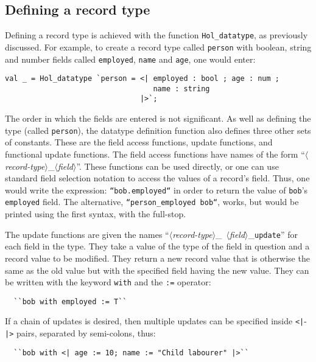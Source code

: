 \subsection{Defining a record type}

Defining a record type is achieved with the function
\texttt{Hol\_datatype}, as previously discussed.  For example, to
create a record type called {\tt person} with boolean, string and
number fields called {\tt employed}, {\tt name} and {\tt age}, one
would enter:
\begin{verbatim}
val _ = Hol_datatype `person = <| employed : bool ; age : num ;
                                  name : string
                               |>`;
\end{verbatim}
The order in which the fields are entered is not significant. As well
as defining the type (called {\tt person}), the datatype definition
function also defines three other sets of constants.  These are the
field access functions, update functions, and functional update
functions.  The field access functions have names of the form
``$\langle$\textsl{record-type\/}$\rangle$\_$\langle$\textsl{field\/}$\rangle$''.
These functions can be used directly, or one can use standard field
selection notation to access the values of a record's field.  Thus,
one would write the expression: \mbox{\tt ``bob.employed``} in order
to return the value of {\tt bob}'s {\tt employed} field.  The
alternative, \texttt{``person\_employed bob``}, works, but would be
printed using the first syntax, with the full-stop.

The update functions are given the names
\mbox{``$\langle$\textsl{record-type\/}$\rangle$\_%
$\langle$\textsl{field\/}$\rangle$\_\texttt{update}''} for each
field in the type.  They take a value of the type of the field in
question and a record value to be modified.  They return a new record
value that is otherwise the same as the old value but with the
specified field having the new value.  They can be written with the
keyword \texttt{with} and the \texttt{:=} operator:
\begin{verbatim}
  ``bob with employed := T``
\end{verbatim}
\noindent If a chain of updates is desired, then multiple updates can
be specified inside \texttt{<|}-\texttt{|>} pairs, separated by
semi-colons, thus:

\begin{verbatim}
  ``bob with <| age := 10; name := "Child labourer" |>``
\end{verbatim}

